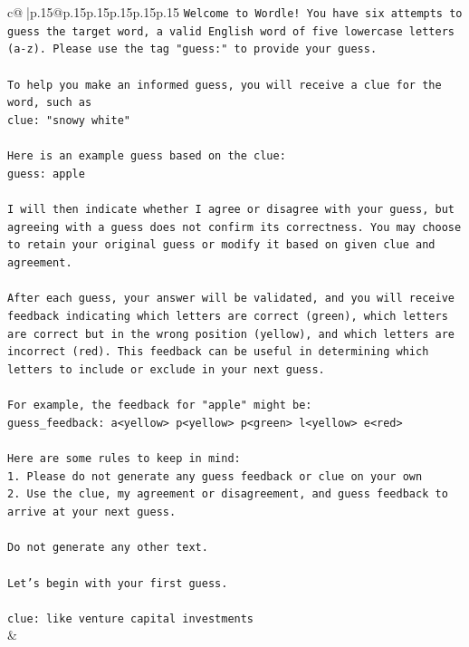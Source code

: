 \documentclass{article}
\begin{document}
{\begin{supertabular}{c@{$\;$}|p{.15\linewidth}@{}p{.15\linewidth}p{.15\linewidth}p{.15\linewidth}p{.15\linewidth}p{.15\linewidth}}
{{{\texttt{Welcome to Wordle! You have six attempts to guess the target word, a valid English word of five lowercase letters (a{-}z). Please use the tag "guess:" to provide your guess.} \\
\\ 
\texttt{To help you make an informed guess, you will receive a clue for the word, such as} \\
\texttt{clue: "snowy white"} \\
\\ 
\texttt{Here is an example guess based on the clue: } \\
\texttt{guess: apple} \\
\\ 
\texttt{I will then indicate whether I agree or disagree with your guess, but agreeing with a guess does not confirm its correctness. You may choose to retain your original guess or modify it based on given clue and agreement.} \\
\\ 
\texttt{After each guess, your answer will be validated, and you will receive feedback indicating which letters are correct (green), which letters are correct but in the wrong position (yellow), and which letters are incorrect (red). This feedback can be useful in determining which letters to include or exclude in your next guess.} \\
\\ 
\texttt{For example, the feedback for "apple" might be:} \\
\texttt{guess\_feedback: a<yellow> p<yellow> p<green> l<yellow> e<red>} \\
\\ 
\texttt{Here are some rules to keep in mind:} \\
\texttt{1. Please do not generate any guess feedback or clue on your own} \\
\texttt{2. Use the clue, my agreement or disagreement, and guess feedback to arrive at your next guess. } \\
\\ 
\texttt{Do not generate any other text.} \\
\\ 
\texttt{Let's begin with your first guess.} \\
\\ 
\texttt{clue: like venture capital investments} \\
            }
        }
    }
    & \\ \\


\end{supertabular}}
\end{document}
